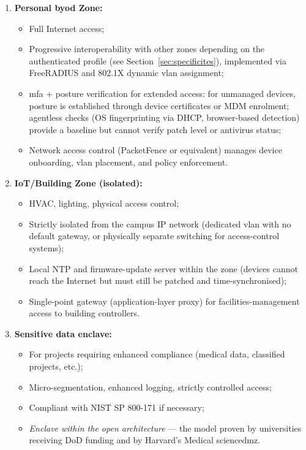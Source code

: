 \begin{enumerate}
    \item \textbf{Personal \gls{byod} Zone:}
    \begin{itemize}[nosep]
        \item Full Internet access;
        \item Progressive interoperability with other zones depending on
        the authenticated profile (see Section~\ref{sec:specificites}),
        implemented via FreeRADIUS and 802.1X dynamic \gls{vlan} assignment;
        \item \gls{mfa} + posture verification for extended access:
        for unmanaged devices, posture is established through device
        certificates or MDM enrolment; agentless checks (OS fingerprinting
        via DHCP, browser-based detection) provide a baseline but cannot
        verify patch level or antivirus status;
        \item Network access control (PacketFence or equivalent) manages
        device onboarding, \gls{vlan} placement, and policy enforcement.
    \end{itemize}

    \item \textbf{IoT/Building Zone (isolated):}
    \begin{itemize}[nosep]
        \item HVAC, lighting, physical access control;
        \item Strictly isolated from the campus IP network
        (dedicated \gls{vlan} with no default gateway, or physically
        separate switching for access-control systems);
        \item Local NTP and firmware-update server within the zone
        (devices cannot reach the Internet but must still be patched
        and time-synchronised);
        \item Single-point gateway (application-layer proxy) for
        facilities-management access to building controllers.
    \end{itemize}

    \item \textbf{Sensitive data enclave:}
    \begin{itemize}[nosep]
        \item For projects requiring enhanced compliance
        (medical data, classified projects, etc.);
        \item Micro-segmentation, enhanced logging, strictly
        controlled access;
        \item Compliant with NIST SP 800-171 if necessary;
        \item \emph{Enclave within the open architecture} --- the model
        proven by universities receiving DoD funding and by
        Harvard's Medical \gls{sciencedmz}.
    \end{itemize}
\end{enumerate}

